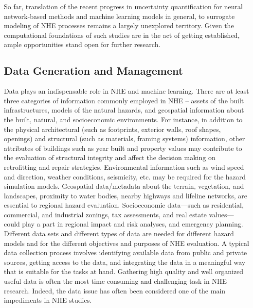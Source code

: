 So far, translation of the recent progress in uncertainty quantification for neural network-based methods and machine learning models in general, to surrogate modeling of NHE processes remains a largely unexplored territory. Given the computational foundations of such studies are in the act of getting established, ample opportunities stand open for further research.

\subsection{Data Generation and Management}

Data plays an indispensable role in NHE and machine learning. There are at least three categories of information commonly employed in NHE – assets of the built infrastructures, models of the natural hazards, and geospatial information about the built, natural, and socioeconomic environments. For instance, in addition to the physical architectural (such as footprints, exterior walls, roof shapes, openings) and structural (such as materials, framing systems) information, other attributes of buildings such as year built and property values may contribute to the evaluation of structural integrity and affect the decision making on retrofitting and repair strategies. Environmental information such as wind speed and direction, weather conditions, seismicity, etc. may be required for the hazard simulation models. Geospatial data/metadata about the terrain, vegetation, and landscapes, proximity to water bodies, nearby highways and lifeline networks, are essential to regional hazard evaluation. Socioeconomic data—such as residential, commercial, and industrial zonings, tax assessments, and real estate values—could play a part in regional impact and risk analyses, and emergency planning. Different data sets and different types of data are needed for different hazard models and for the different objectives and purposes of NHE evaluation. A typical data collection process involves identifying available data from public and private sources, getting access to the data, and integrating the data in a meaningful way that is suitable for the tasks at hand. Gathering high quality and well organized useful data is often the most time consuming and challenging task in NHE research. Indeed, the data issue has often been considered one of the main impediments in NHE studies. 

